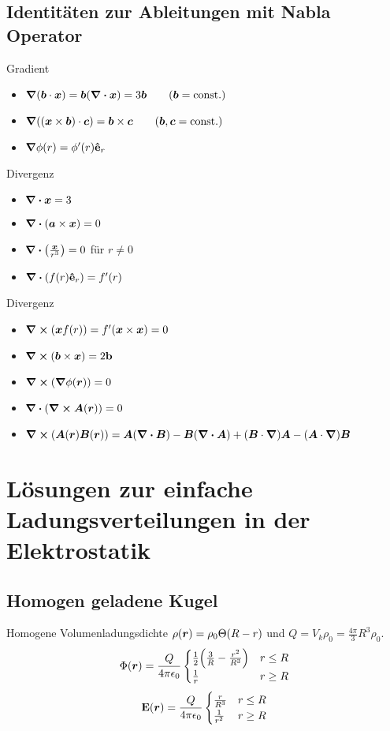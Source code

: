     \subsection{Identitäten zur Ableitungen mit Nabla Operator}
    Gradient  
    \begin{itemize}
      \item $\grad(\vb*b\cdot\vb*x)=\vb*b(\div\vb*x)=3\vb*b
        \qquad(\vb*b=\text{const.})$
      \item $\grad((\vb*x\times\vb*b)\cdot\vb*c)=\vb*b\times\vb*c
        \qquad(\vb*b,\vb*c=\text{const.})$
      \item $\grad\phi(r)=\phi'(r){\vu{e}}_{r}$
    \end{itemize}
    Divergenz  
    \begin{itemize}
      \item $\div\vb*x=3$
      \item $\div(\vb*a\times\vb*x)=0$
      \item $\div(\frac{\vb*x}{r^3})=0$ für $r\neq0$
      \item $\div(f(r){\vu{e}}_{r})=f'(r)$
    \end{itemize}
    Divergenz  
    \begin{itemize}
      \item $\curl(\vb*x f(r))=f'(\vb*x\times\vb*x)=0$
      \item $\curl(\vb*b\times\vb*x)=2\vb b$
      \item $\curl(\grad\phi(\vb*r))=0$
      \item $\div(\curl\vb*A(\vb*r))=0$
      \item $\curl(\vb*A(\vb*r)\vb*B(\vb*r))=
        \vb*A(\div\vb*B)-\vb*B(\div\vb*A)+
        (\vb*B\cdot\grad)\vb*A-(\vb*A\cdot\grad)\vb*B$
    \end{itemize}

  \section{Lösungen zur einfache Ladungsverteilungen in der Elektrostatik}
    \subsection{Homogen geladene Kugel}
    Homogene Volumenladungsdichte $\rho(\vb*r)=\rho_0\Theta(R-r)$
    und $Q=V_k\rho_0=\frac{4\pi}{3}R^3\rho_0$.
    \begin{equation}
      \Phi(\vb*r)=\frac{Q}{4\pi\epsilon_0} 
    \begin{cases}
      \frac{1}{2} \qty(\frac{3}{R} -\frac{r^2}{R^3} )&r\le R\\
      \frac{1}{r} & r\ge R
    \end{cases}
    \end{equation}
    \begin{equation}
      \vb E(\vb*r)=
      \frac{Q}{4\pi\epsilon_0} 
      \begin{cases}
        \frac{r}{R^3} & r\le R\\
        \frac{1}{r^2} & r\ge R\\
      \end{cases}
    \end{equation}
    
